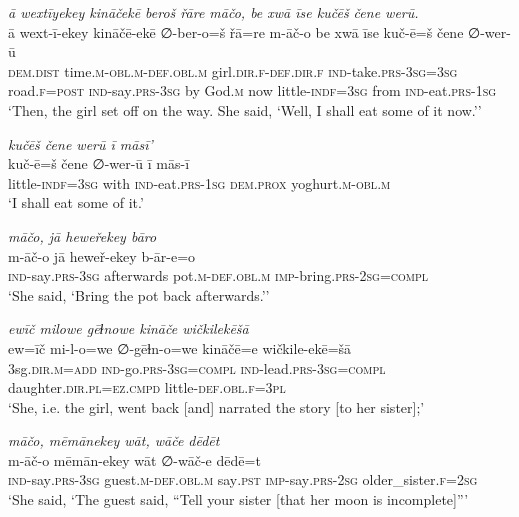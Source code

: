 \ea \label{ŽH.41}
\textit{ā wextīyekey kināčekē beroš řāre māčo, be xwā īse kučēš čene werū.} \\ 
\gll ā wext-ī-ekey kināčē-ekē ∅-ber-o=š řā=re m-āč-o be xwā īse kuč-ē=š čene ∅-wer-ū \\ 
 \textsc{dem.dist} time\textsc{.m}\textsc{-obl}\textsc{.m}\textsc{-def}\textsc{.obl}\textsc{.m} girl\textsc{.dir}\textsc{\textsc{.f}}\textsc{-def}\textsc{.dir}\textsc{\textsc{.f}} \textsc{ind-}take\textsc{.prs}\textsc{-3sg}\textsc{=3sg} road\textsc{\textsc{.f}}\textsc{=\textsc{post}} \textsc{ind-}say\textsc{.prs}\textsc{-3sg} by God\textsc{.m} now little\textsc{-indf}\textsc{=3sg} from \textsc{ind-}eat\textsc{.prs}\textsc{-1sg} \\ 
\glt `Then, the girl set off on the way. She said, ‘Well, I shall eat some of it now.’'
\z 
 
\ea \label{ŽH.42}
\textit{kučēš čene werū ī māsī’} \\ 
\gll kuč-ē=š čene ∅-wer-ū ī mās-ī \\ 
 little\textsc{-indf}\textsc{=3sg} with \textsc{ind-}eat\textsc{.prs}\textsc{-1sg} \textsc{dem.prox} yoghurt\textsc{.m}\textsc{-obl}\textsc{.m} \\ 
\glt `I shall eat some of it.'
\z 
 
\ea \label{ŽH.44}
\textit{māčo, jā heweřekey bāro} \\ 
\gll m-āč-o jā heweř-ekey b-ār-e=o \\ 
 \textsc{ind-}say\textsc{.prs}\textsc{-3sg} afterwards pot\textsc{.m}\textsc{-def}\textsc{.obl}\textsc{.m} \textsc{imp-}bring\textsc{.prs}-\textsc{2sg}\textsc{=compl} \\ 
\glt `She said, ‘Bring the pot back afterwards.’'
\z 
 
\ea \label{ŽH.46}
\textit{ewīč milowe gēɫnowe kināče wičkilekēšā} \\ 
\gll ew=īč mi-l-o=we ∅-gēɫn-o=we kināčē=e wičkile-ekē=šā \\ 
 3sg\textsc{.dir}\textsc{.m}\textsc{=add} \textsc{ind-}go\textsc{.prs}\textsc{-3sg}\textsc{=compl} \textsc{ind-}lead\textsc{.prs}\textsc{-3sg}\textsc{=compl} daughter\textsc{.dir}\textsc{.pl}\textsc{=ez}\textsc{.cmpd} little\textsc{-def}\textsc{.obl}\textsc{\textsc{.f}}\textsc{=3pl} \\ 
\glt `She, i.e. the girl, went back [and] narrated the story [to her sister];'
\z 
 
\ea \label{ŽH.47}
\textit{māčo, mēmānekey wāt, wāče dēdēt} \\ 
\gll m-āč-o mēmān-ekey wāt ∅-wāč-e dēdē=t \\ 
 \textsc{ind-}say\textsc{.prs}\textsc{-3sg} guest\textsc{.m}\textsc{-def}\textsc{.obl}\textsc{.m} say\textsc{.pst} \textsc{imp-}say\textsc{.prs-}\textsc{2sg} older\_sister\textsc{\textsc{.f}}\textsc{=\textsc{2sg}} \\ 
\glt `She said, ‘The guest said, “Tell your sister [that her moon is incomplete]”'
\z 
 
